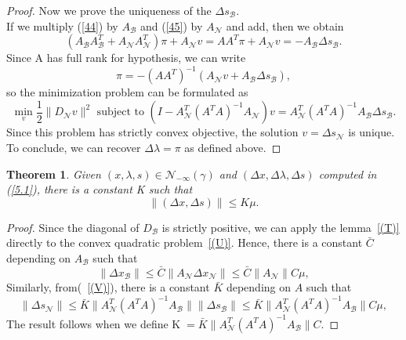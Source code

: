 \documentclass[a4paper,10 pt,titlepage,twoside]{book}
\theoremstyle{plain}
\newtheorem{thm}{Theorem}[chapter]
\theoremstyle{definition}
\theoremstyle{remark}
\begin{document}
\begin{proof}
	Now we prove the uniqueness of the $\Delta s_{\mathcal{B}}$.\\
	If we multiply (\ref{44}) by $A_{\mathcal{B}}$ and (\ref{45}) by $A_{\mathcal{N}}$ and add, then we obtain
	\begin{equation*}
	(A_{\mathcal{B}}A_{\mathcal{B}}^{T}+A_{\mathcal{N}}A_{\mathcal{N}}^{T})\pi+A_{\mathcal{N}}v = AA^{T}\pi+A_{\mathcal{N}}v = -A_{\mathcal{B}}\Delta s_{\mathcal{B}}.
	\end{equation*} 
	Since A has full rank for hypothesis, we can write
	\begin{equation*}
	\pi = -(AA^{T})^{-1}(A_{\mathcal{N}}v +A_{\mathcal{B}}\Delta s_{\mathcal{B}}),
	\end{equation*}
	so the minimization problem can be formulated as
	\begin{equation}\label{(V)}
	\min\limits_{v}\frac{1}{2}\lVert D_{\mathcal{N}}v\rVert^{2} \text{ subject to }
	(I-A_{\mathcal{N}}^{T}(A^{T}A)^{-1}A_{\mathcal{N}})v =A_{\mathcal{N}}^{T}(A^{T}A)^{-1}A_{\mathcal{B}}\Delta s_{\mathcal{B}}.		 
	\end{equation}
	Since this problem  has strictly convex objective, the solution $v=\Delta s_{\mathcal{N}}$ is unique. To conclude, we can recover $\Delta \lambda=\pi$ as defined above. 
\end{proof}
\begin{thm}\label{(Z)}
	Given $(x, \lambda, s)\in\mathcal{N}_{- \infty}(\gamma)$ and $(\Delta x,\Delta \lambda, \Delta s)$ computed in (\ref{5.1}), there is a constant K such that
	\begin{equation*}
	\lVert (\Delta x, \Delta s)\rVert \leq K \mu.
	\end{equation*}
\end{thm}
\begin{proof}
	Since the diagonal of $D_{\mathcal{B}}$ is strictly positive, we can apply the lemma~\ref{(T)} directly to the convex quadratic problem~\ref{(U)}. Hence, there is a constant $\bar{C}$ depending on $A_{\mathcal{B}}$ such that
	\begin{equation}
	\lVert \Delta x_{\mathcal{B}}\rVert \leq \bar{C}\lVert A_{\mathcal{N}}\Delta x_{\mathcal{N}}\rVert\leq \bar{C}\lVert A_{\mathcal{N}}\rVert C\mu,
	\end{equation}
	Similarly, from(~\ref{(V)}), there is a constant $\bar{K}$ depending on $A$ such that
	\begin{equation}
	\lVert \Delta s_{\mathcal{N}}\rVert \leq \bar{K}\lVert A_{\mathcal{N}}^{T}(A^{T}A)^{-1}A_{\mathcal{B}}\rVert\lVert \Delta s_{\mathcal{B}}\rVert \leq\bar{K} \lVert A_{\mathcal{N}}^{T}(A^{T}A)^{-1}A_{\mathcal{B}}\rVert C\mu,
	\end{equation}
	The result follows when we define K$\;=\bar{K} \lVert A_{\mathcal{N}}^{T}(A^{T}A)^{-1}A_{\mathcal{B}}\rVert C$.
\end{proof}
\end{document}
